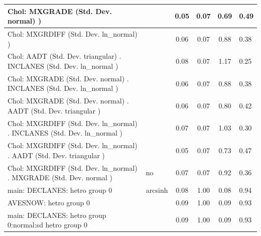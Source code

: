 \begin{table}
\begin{center}
\begin{tabular}{|l|l|c|c|c|l|}
			\hline
			 Chol: MXGRADE (Std. Dev. normal) ) &  & 0.05 & 0.07 & 0.69 & 0.49 \\
			\hline
			 Chol: MXGRDIFF (Std. Dev. ln_normal) ) &  & 0.06 & 0.07 & 0.88 & 0.38 \\
			\hline
			 Chol: AADT (Std. Dev. triangular) . INCLANES (Std. Dev.   ln_normal ) &  & 0.08 & 0.07 & 1.17 & 0.25 \\
			\hline
			 Chol: MXGRADE (Std. Dev. normal) . INCLANES (Std. Dev.   ln_normal ) &  & 0.06 & 0.07 & 0.88 & 0.38 \\
			\hline
			 Chol: MXGRADE (Std. Dev. normal) . AADT (Std. Dev.   triangular ) &  & 0.06 & 0.07 & 0.80 & 0.42 \\
			\hline
			 Chol: MXGRDIFF (Std. Dev. ln_normal) . INCLANES (Std. Dev.   ln_normal ) &  & 0.07 & 0.07 & 1.03 & 0.30 \\
			\hline
			 Chol: MXGRDIFF (Std. Dev. ln_normal) . AADT (Std. Dev.   triangular ) &  & 0.05 & 0.07 & 0.73 & 0.47 \\
			\hline
			 Chol: MXGRDIFF (Std. Dev. ln_normal) . MXGRADE (Std. Dev.   normal ) & no & 0.07 & 0.07 & 0.92 & 0.36 \\
			\hline
			main: DECLANES: hetro group 0 & arcsinh & 0.08 & 1.00 & 0.08 & 0.94 \\
			\hline
			AVESNOW: hetro group 0 &  & 0.09 & 1.00 & 0.09 & 0.93 \\
			\hline
			main: DECLANES: hetro group 0:normal:sd  hetro group 0 &  & 0.09 & 1.00 & 0.09 & 0.93 \\
			\hline
		\end{tabular}
	\end{center}
\end{table}